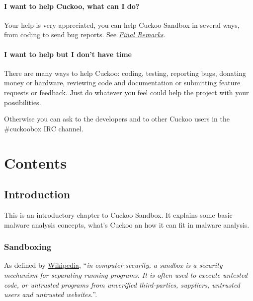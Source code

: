 \documentclass[letterpaper,10pt,english]{sphinxmanual}
\begin{document}
\subsubsection{I want to help Cuckoo, what can I do?}
\label{faq/index:i-want-to-help-cuckoo-what-can-i-do}\label{faq/index:question-5}
Your help is very appreciated, you can help Cuckoo Sandbox in several ways,
from coding to send bug reports. See {\hyperref[finalremarks/index::doc]{\emph{Final Remarks}}}.


\subsubsection{I want to help but I don't have time}
\label{faq/index:i-want-to-help-but-i-don-t-have-time}\label{faq/index:question-6}
There are many ways to help Cuckoo: coding, testing, reporting bugs, donating
money or hardware, reviewing code and documentation or submitting feature
requests or feedback.
Just do whatever you feel could help the project with your possibilities.

Otherwise you can ask to the developers and to other Cuckoo users in the
\#cuckoobox IRC channel.


\chapter{Contents}
\label{index:cuckoobox}\label{index:contents}

\section{Introduction}
\label{introduction/index:introduction}\label{introduction/index::doc}
This is an introductory chapter to Cuckoo Sandbox.
It explains some basic malware analysis concepts, what's Cuckoo an how it can fit in malware analysis.


\subsection{Sandboxing}
\label{introduction/sandboxing:sandboxing}\label{introduction/sandboxing::doc}
As defined by \href{http://en.wikipedia.org/wiki/Sandbox\_\%28computer\_security\%29}{Wikipedia}, ``\emph{in computer security, a sandbox is a security
mechanism for separating running programs. It is often used to execute untested
code, or untrusted programs from unverified third-parties, suppliers, untrusted
users and untrusted websites.}''.
\end{document}

